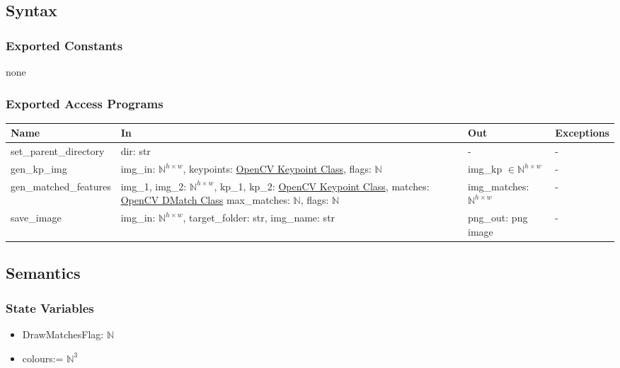 \documentclass[12pt, titlepage]{article}
\begin{document}
\subsection{Syntax}
\subsubsection{Exported Constants}
none 

\subsubsection{Exported Access Programs}
\begin{center}
\begin{tabular}{p{4cm} p{5cm} p{4cm} p{2cm}}
\hline
\textbf{Name} & \textbf{In} & \textbf{Out} & \textbf{Exceptions} \\
\hline
set\_parent\_directory
& dir: str
& -
& - \\
\hline
gen\_kp\_img 
& img\_in: $\mathbb{N}^{h \times w}$, \newline
keypoints: \href{https://docs.opencv.org/3.4/d2/d29/classcv_1_1KeyPoint.html}{OpenCV Keypoint Class}, \newline
flags: $\mathbb{N}$ & img\_kp $\in \mathbb{N}^{h \times w}$ & - \\
\hline
gen\_matched\_features 
& img\_1, img\_2: $\mathbb{N}^{h \times w}$, \newline
kp\_1, kp\_2: \href{https://docs.opencv.org/3.4/d2/d29/classcv_1_1KeyPoint.html}{OpenCV Keypoint Class}, \newline
matches: \href{https://docs.opencv.org/3.4/d4/de0/classcv_1_1DMatch.html}{OpenCV DMatch Class} \newline
max\_matches: $\mathbb{N}$, \newline
flags: $\mathbb{N}$
& img\_matches: $\mathbb{N}^{h \times w}$ & - \\
\hline
save\_image
& img\_in: $\mathbb{N}^{h \times w}$, \newline
target\_folder: str, \newline
img\_name: str
& png\_out: png image
& - \\
\hline
\end{tabular}
\end{center}

\subsection{Semantics}

\subsubsection{State Variables}
\begin{itemize}
  \item DrawMatchesFlag: $\mathbb{N}$
  \item colours:= $\mathbb{N}^{3}$
\end{itemize}
\end{document}
